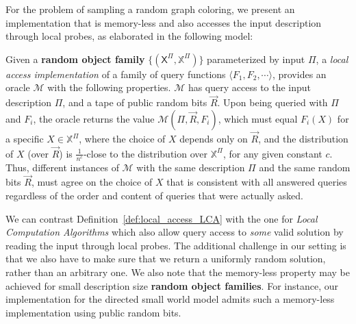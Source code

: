 
For the problem of sampling a random graph coloring,
we present an implementation that is memory-less and also accesses the input description through local probes,
as elaborated in the following model:

\begin{definition}
\label{def:local_access_LCA}
Given a \textbf{random object family} $\{(\mathsf X^{\Pi}, \mathbb X^{\Pi})\}$ parameterized by input $\Pi$,
a \emph{local access implementation} of a family of query functions $\langle F_1, F_2,\cdots \rangle$,
provides an oracle $\mathcal M$ with the following properties.
$\mathcal M$ has query access to the input description $\Pi$, and a tape of public random bits $\vec R$.
Upon being queried with $\Pi$ and $F_i$, the oracle returns the value $\mathcal M(\Pi,\vec R,F_i)$,
which must equal $F_i(X)$ for a specific $X\in\mathbb X^{\Pi}$, where the choice of $X$ depends only on $\vec R$,
and the distribution of $X$ (over $\vec R$) is $\frac1{n^c}$-close to the distribution over $\mathbb X^{\Pi}$, for any given constant $c$.
Thus, different instances of $\mathcal M$ with the same description $\Pi$ and the same random bits $\vec R$,
must agree on the choice of $X$ that is consistent with all answered queries regardless of the order and content of queries that were actually asked.
\end{definition}

We can contrast Definition~\ref{def:local_access_LCA} with the one for \emph{Local Computation Algorithms} \cite{LCA, LCA_space_efficient}
which also allow query access to \emph{some} valid solution by reading the input through local probes.
The additional challenge in our setting is that we also have to make sure that we return a uniformly random solution, rather than an arbitrary one.
We also note that the memory-less property may be achieved for small description size \textbf{random object families}.
For instance, our implementation for the directed small world model admits such a memory-less implementation using public random bits.




